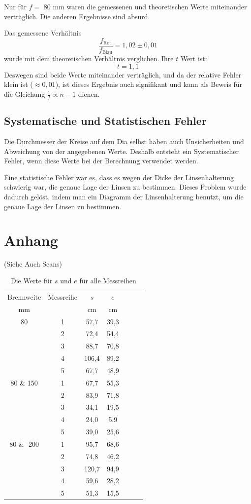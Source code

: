 \documentclass[11pt,a4paper]{article}
\begin{document}
Nur für $f=$ 80 mm waren die gemessenen und theoretischen Werte miteinander verträglich. Die anderen Ergebnisse sind absurd. 

Das gemessene Verhältnis $$\frac{f_\textrm{Rot}}{f_\textrm{Blau}} = 1,02\pm 0,01$$ 
wurde mit dem theoretischen Verhältnis verglichen. Ihre $t$ Wert ist:
$$t = 1,1$$
Deswegen sind beide Werte miteinander verträglich, und da der relative Fehler klein ist ($\approx 0,01$), ist dieses Ergebnis auch signifikant und kann als Beweis für die Gleichung $\frac{1}{f}\propto n-1$ dienen. 

\subsection{Systematische und Statistischen Fehler}
Die Durchmesser der Kreise auf dem Dia selbst haben auch Unsicherheiten und Abweichung von der angegebenen Werte. Deshalb entsteht ein Systematischer Fehler, wenn diese Werte bei der Berechnung verwendet werden. 

Eine statistische Fehler war es, dass es wegen der Dicke der Linsenhalterung schwierig war, die genaue Lage der Linsen zu bestimmen. Dieses Problem wurde dadurch gelöst, indem man ein Diagramm der Linsenhalterung benutzt, um die genaue Lage der Linsen zu bestimmen. 

\section{Anhang}
(Siehe Auch Scans)

\begin{table}[h]
	\centering
	\begin{tabular*}{0.50\textwidth}{@{\extracolsep{\fill}}cc|ccccc}
		\toprule
		Brennweite & Messreihe & $s$ & $e$   \\
		mm &  & cm & cm  \\
		\bottomrule
		80 & 1 & 57,7 & 39,3 \\
		& 2 & 72,4 & 54,4 \\
		& 3 & 88,7 & 70,8 \\
		& 4 & 106,4 & 89,2 \\
		& 5 & 67,7 & 48,9 \\
		80 \& 150 & 1 & 67,7 & 55,3 \\
		& 2 & 83,9 & 71,8 \\
		& 3 & 34,1 & 19,5 \\
		& 4 & 24,0 & 5,9 \\
		& 5 & 39,0 & 25,6 \\
		80 \& -200 & 1 & 95,7 & 68,6 \\
		& 2 & 74,8 & 46,2 \\
		& 3 & 120,7 & 94,9 \\
		& 4 & 59,6 & 28,2 \\
		& 5 & 51,3 & 15,5 \\
		\bottomrule
	\end{tabular*}
	\caption{Die Werte für $s$ und $e$ für alle Messreihen}
\end{table}
\end{document}
